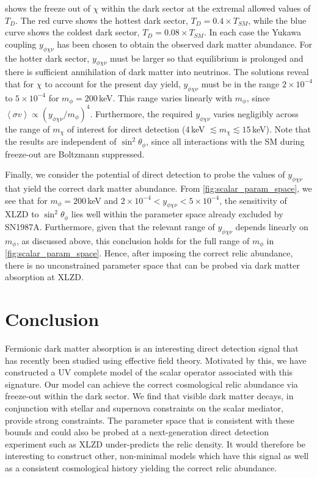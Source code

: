 \documentclass[aps, prd, reprint, nofootinbib, amsmath, amssymb, floatfix]{revtex4-2}
\begin{document}
 shows the freeze out of $\chi$ within the dark sector at the extremal allowed values of $T_D$. The red curve shows the hottest dark sector, $T_D = 0.4 \times T_{SM}$, while the blue curve shows the coldest dark sector, $T_D = 0.08 \times T_{SM}$. In each case the Yukawa coupling $y_{\phi\chi\nu}$ has been chosen to obtain the observed dark matter abundance. For the hotter dark sector, $y_{\phi\chi\nu}$ must be larger so that equilibrium is prolonged and there is sufficient annihilation of dark matter into neutrinos. The solutions reveal that for $\chi$ to account for the present day yield, $y_{\phi\chi\nu}$ must be in the range $2\times10^{-4}$ to $5\times10^{-4}$ for $m_\phi = 200$\,keV. This range varies linearly with $m_\phi$, since $\left<\sigma v\right> \propto \left(y_{\phi\chi\nu}/m_\phi\right)^4$. Furthermore, the required $y_{\phi\chi\nu}$ varies negligibly across the range of $m_\chi$ of interest for direct detection (4\,keV $\lesssim m_\chi \lesssim 15$\,keV). Note that the results are independent of $\sin^2\theta_\phi$, since all interactions with the SM during freeze-out are Boltzmann suppressed.

Finally, we consider the potential of direct detection to probe the values of $y_{\phi\chi\nu}$ that yield the correct dark matter abundance. From \cref{fig:scalar_param_space}, we see that for $m_\phi = 200$\,keV and $2\times10^{-4} < y_{\phi\chi\nu} < 5\times10^{-4}$, the sensitivity of XLZD to $\sin^2\theta_\phi$ lies well within the parameter space already excluded by SN1987A. Furthermore, given that the relevant range of $y_{\phi\chi\nu}$ depends linearly on $m_\phi$, as discussed above, this conclusion holds for the full range of $m_\phi$ in \cref{fig:scalar_param_space}. Hence, after imposing the correct relic abundance, there is no unconstrained parameter space that can be probed via dark matter absorption at XLZD.



\section{\label{sec:conclusion}Conclusion}

Fermionic dark matter absorption is an interesting direct detection signal that has recently been studied using effective field theory. Motivated by this, we have constructed a UV complete model of the scalar operator associated with this signature. Our model can achieve the correct cosmological relic abundance via freeze-out within the dark sector. We find that visible dark matter decays, in conjunction with stellar and supernova constraints on the scalar mediator, provide strong constraints. The parameter space that is consistent with these bounds and could also be probed at a next-generation direct detection experiment such as XLZD under-predicts the relic density. It would therefore be interesting to construct other, non-minimal models which have this signal as well as a consistent cosmological history yielding the correct relic abundance. 
\end{document}

